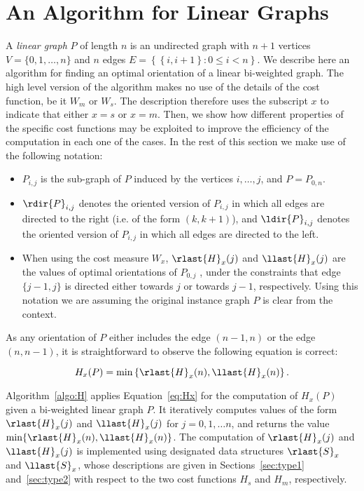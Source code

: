 
\section{An Algorithm for Linear Graphs}
\label{sec:linear}

A \emph{linear graph} $P$ of length $n$ is an undirected graph with $n+1$
vertices $V = \{0, 1, \ldots, n\}$ and $n$ edges $E = \left\{\left\{i, i+1\right\} : 0\leq i < n\right\}$. 
%
We describe here an algorithm for finding an optimal orientation 
of a linear bi-weighted graph. The high level version of the algorithm makes no use of the details
of the cost function, be it $W_m$ or $W_s$. The description therefore uses the subscript $x$ to indicate that either $x=s$ or $x=m$. Then, we show how different properties of the specific cost functions may be exploited to improve the efficiency of the computation in each one of the cases. In the rest of this section we make use of the following notation:
%
\begin{itemize}
	\item $P_{i, j}$ is the sub-graph of $P$ induced by the vertices $i,  \ldots, j$, and $P=P_{0,n}$. 
	\item $\rdir{P}_{i, j}$ denotes the oriented version 
	of $P_{i, j}$ in which all edges are directed to the right (i.e. of the form $(k, {k+1})$),	
	and $\ldir{P}_{i, j}$ denotes the oriented version 
	of $P_{i, j}$ in which all edges are directed to the left.
	\item When using the cost measure $W_x$, $\rlast{H}_x(j)$ and $\llast{H}_x(j)$ are the values of optimal orientations of $P_{0, j}$ , under the constraints	that edge $\{j-1, j\}$ is directed either towards $j$ or towards $j-1$, respectively. Using this notation we are assuming the original instance graph $P$ is clear from the context.
\end{itemize}

As any orientation of $P$ either includes the edge $(n-1, n)$ or the edge $(n, n-1)$, it is straightforward to observe the following equation is correct:

\begin{equation}
\label{eq:Hx}
H_x(P) = \min \left\{\rlast{H}_x(n), \llast{H}_x(n)\right\}.
\end{equation}

Algorithm~\ref{algo:H} applies Equation~\ref{eq:Hx} for the computation of $H_x(P)$ given a bi-weighted linear graph $P$. It iteratively computes values of the form $\rlast{H}_x(j)$ and $\llast{H}_x(j)$ for $j = 0, 1, \ldots n$, and returns the value $\min\{\rlast{H}_x(n), \llast{H}_x(n)\}$. The computation of $\rlast{H}_x(j)$ and $\llast{H}_x(j)$ is implemented using designated data structures $\rlast{S}_x$ and $\llast{S}_x$, whose descriptions are given in Sections~\ref{sec:type1} and~\ref{sec:type2} with respect to the two cost functions $H_s$ and $H_m$, respectively.

